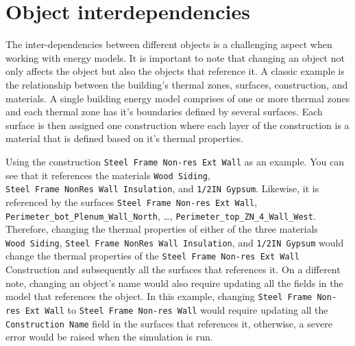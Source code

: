 \documentclass[
]{book}
\begin{document}
\hypertarget{object-interdependencies}{%
\section{Object interdependencies}\label{object-interdependencies}}

The inter-dependencies between different objects is a challenging aspect when working with energy models. It is important to note that changing an object not only affects the object but also the objects that reference it. A classic example is the relationship between the building's thermal zones, surfaces, construction, and materials. A single building energy model comprises of one or more thermal zones and each thermal zone has it's boundaries defined by several surfaces. Each surface is then assigned one construction where each layer of the construction is a material that is defined based on it's thermal properties.

Using the construction \texttt{Steel\ Frame\ Non-res\ Ext\ Wall} as an example. You can see that it references the materials \texttt{Wood\ Siding}, \texttt{Steel\ Frame\ NonRes\ Wall\ Insulation}, and \texttt{1/2IN\ Gypsum}. Likewise, it is referenced by the surfaces \texttt{Steel\ Frame\ Non-res\ Ext\ Wall}, \texttt{Perimeter\_bot\_Plenum\_Wall\_North}, \ldots, \texttt{Perimeter\_top\_ZN\_4\_Wall\_West}. Therefore, changing the thermal properties of either of the three materials \texttt{Wood\ Siding}, \texttt{Steel\ Frame\ NonRes\ Wall\ Insulation}, and \texttt{1/2IN\ Gypsum} would change the thermal properties of the \texttt{Steel\ Frame\ Non-res\ Ext\ Wall} Construction and subsequently all the surfaces that references it. On a different note, changing an object's name would also require updating all the fields in the model that references the object. In this example, changing \texttt{Steel\ Frame\ Non-res\ Ext\ Wall} to \texttt{Steel\ Frame\ Non-res\ Wall} would require updating all the \texttt{Construction\ Name} field in the surfaces that references it, otherwise, a severe error would be raised when the simulation is run.
\end{document}
